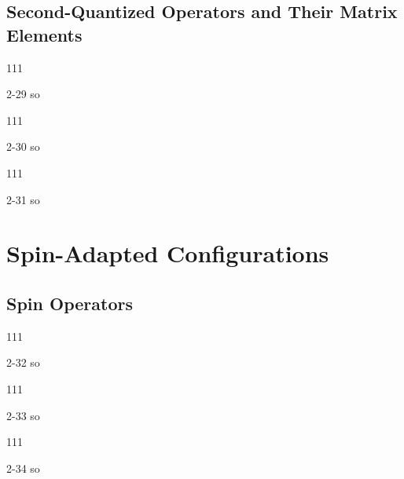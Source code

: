 \documentclass[a4paper]{book}
\begin{document}
	\subsection{Second-Quantized Operators and Their Matrix Elements}
	
	\begin{exercise}
	111
	\end{exercise}
	
	\begin{solution}
		2-29 so
	\end{solution}
	
	\begin{exercise}
	111
	\end{exercise}
	
	\begin{solution}
		2-30 so
	\end{solution}
	
	\begin{exercise}
	111
	\end{exercise}
	
	\begin{solution}
		2-31 so
	\end{solution}
	
	\section{Spin-Adapted Configurations}
	
	\subsection{Spin Operators}
	
	\begin{exercise}
	111
	\end{exercise}
	
	\begin{solution}
		2-32 so
	\end{solution}
	
	\begin{exercise}
	111
	\end{exercise}
	
	\begin{solution}
		2-33 so
	\end{solution}
	
	\begin{exercise}
	111
	\end{exercise}
	
	\begin{solution}
		2-34 so
	\end{solution}
	
\end{document}
